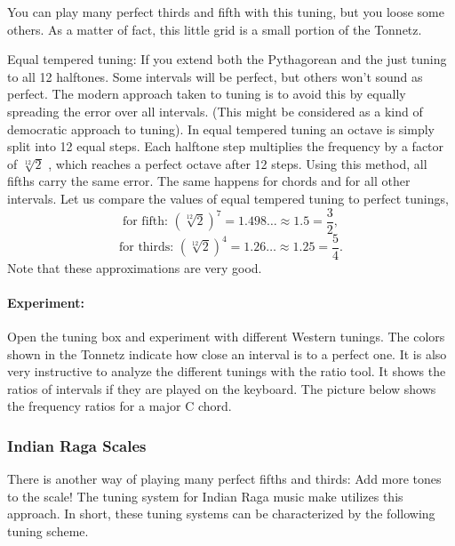 You can play many perfect thirds and fifth with this tuning, but you loose some others. As a matter of fact, this little grid is a small portion of the Tonnetz.


Equal tempered tuning: If you extend both the Pythagorean and the just tuning to all 12 halftones. Some intervals will be perfect, but others won't sound as perfect. The modern approach taken to tuning is to avoid this by equally spreading the error over all intervals. (This might be considered as a kind of democratic approach to tuning). In equal tempered tuning an octave is simply split into 12 equal steps. Each halftone step multiplies the frequency by a factor of $\sqrt[12]{2}$ , which reaches a perfect octave after 12 steps. Using this method, all fifths carry the same error. The same happens for chords and for all other intervals. Let us compare the values of equal tempered tuning to perfect tunings,
$$\textrm{for fifth: } (\sqrt[12]{2})^7 = 1.498\ldots \approx 1.5 = \frac{3}{2} ,$$
$$\textrm{for thirds: } (\sqrt[12]{2})^4 = 1.26\ldots \approx 1.25 = \frac{5}{4} .$$
Note that these approximations are very good.

\paragraph{Experiment:}
Open the tuning box and experiment with different Western tunings. The colors shown in the Tonnetz indicate how close an interval is to a perfect one. It is also very instructive to analyze the different tunings with the ratio tool. It shows the ratios of intervals if they are played on the keyboard. The picture below shows the frequency ratios for a major C chord.

\begin{figure}[h]
\centering
{}
\end{figure}

\subsubsection{Indian Raga Scales}
There is another way of playing many perfect fifths and thirds: Add more tones to the scale!  The tuning system for Indian Raga music make utilizes this approach. In short, these tuning systems can be characterized by the following tuning scheme.


